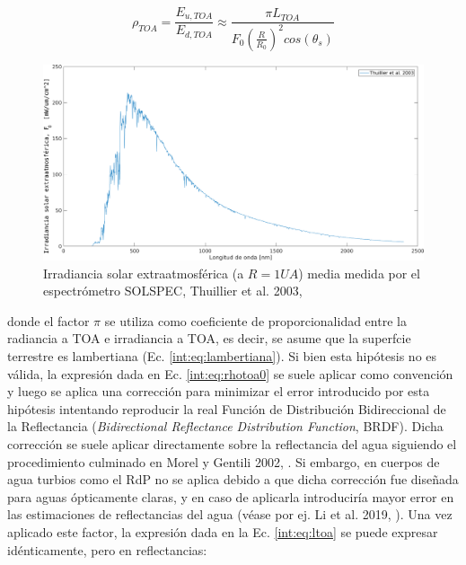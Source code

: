     \begin{equation}
        \rho_{TOA} = \frac{E_{u,TOA}}{E_{d,TOA}}\approx \frac{\pi L_{TOA}}{F_{0}\left(\frac{R}{R_{0}}\right)^{2}cos(\theta_{s})}
        \label{int:eq:rhotoa0}
    \end{equation}

    \begin{figure}
    \centering
    \includegraphics[width=\textwidth]{int/figures/hiper_thuillier.png}
    \caption[Irradiancia solar extraatmosférica (a $R = 1 UA$).]{Irradiancia solar extraatmosférica (a $R = 1 UA$) media medida por el espectrómetro SOLSPEC, Thuillier et al. 2003, \cite{thuillier2003}}
    \label{int:hiper_thuillier}
    \end{figure}

    \noindent donde el factor $\pi$ se utiliza como coeficiente de proporcionalidad entre la radiancia a TOA e irradiancia a TOA, es decir, se asume que la superfcie terrestre es  lambertiana (Ec. \ref{int:eq:lambertiana}). Si bien esta hipótesis no es válida, la expresión dada en Ec. \ref{int:eq:rhotoa0} se suele aplicar como convención y luego se aplica una corrección para minimizar el error introducido por esta hipótesis intentando reproducir la real Función de Distribución Bidireccional de la Reflectancia (\textit{Bidirectional Reflectance Distribution Function}, BRDF). Dicha corrección se suele aplicar directamente sobre la reflectancia del agua siguiendo el procedimiento culminado en Morel y Gentili 2002, \cite{morel2002}. Si embargo, en cuerpos de agua turbios como el RdP no se aplica debido a que dicha corrección fue diseñada para aguas ópticamente claras, y en caso de aplicarla introduciría mayor error en las estimaciones de reflectancias del agua (véase por ej. Li et al. 2019, \cite{li2019}). Una vez aplicado este factor, la expresión dada en la Ec. \ref{int:eq:ltoa} se puede expresar idénticamente, pero en reflectancias:

